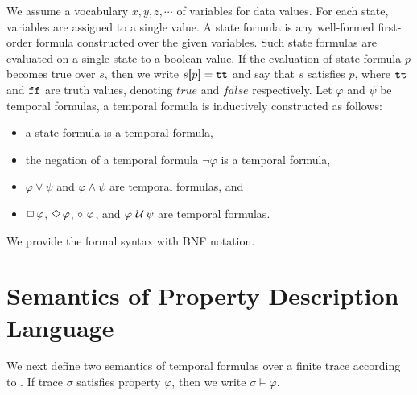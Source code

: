 \documentclass[12pt,a4paper,titlepage]{article}
\theoremstyle{break}
\begin{document}
We assume a vocabulary \(x,y,z,\cdots\) of variables for data values.
For each state, variables are assigned to a single value.
A state formula is any well-formed first-order formula constructed over the given variables.
Such state formulas are evaluated on a single state to a boolean value.
If the evaluation of state formula \(p\) becomes true over \(s\), then we write \(s\mbox{$[\hspace{-.8mm}{|}$} p\mbox{$|\hspace{-.8mm}{]}$}=\mbox{${\tt tt}$}\) and say that \(s\) satisfies \(p\), where $\mbox{${\tt tt}$}$ and $\mbox{${\tt ff}$}$ are truth values, denoting \(true\) and \(false\) respectively.
Let $\varphi$ and $\psi$ be temporal formulas, a temporal formula is inductively constructed as follows:
  \begin{itemize}
\item a state formula is a temporal formula,
\item the negation of a temporal formula \(\neg\varphi\) is a temporal formula,
\item \(\varphi\vee\psi\) and \(\varphi\wedge\psi\) are temporal formulas, and
\item \(\mbox{$\Box$}\,\varphi\), \(\mbox{$\Diamond$}\,\varphi\), \(\mbox{$\circ\,$}\,\varphi\), and \(\varphi\mbox{$\,\,{\cal U}\,$}\psi\) are temporal formulas.
  \end{itemize}

We provide the formal syntax with BNF notation.

\section{Semantics of Property Description Language}
We next define two semantics of temporal formulas over a finite trace according to \cite{Eisner:2003}.
If trace \(\sigma\) satisfies property \(\varphi\), then we write \(\sigma\models\varphi\).
\end{document}
